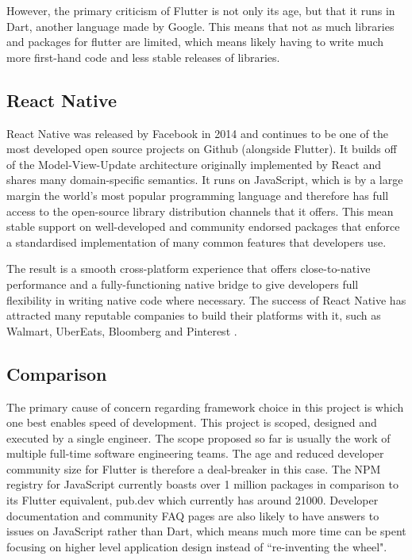 However, the primary criticism of Flutter is not only its age, but that it runs in Dart, another language made by Google. This means that not as much libraries and packages for flutter are limited, which means likely having to write much more first-hand code and less stable releases of libraries.

\subsection{React Native}
React Native was released by Facebook in 2014 and continues to be one of the most developed open source projects on Github (alongside Flutter). It builds off of the Model-View-Update architecture originally implemented by React and shares many domain-specific semantics. It runs on JavaScript, which is by a large margin the world's most popular programming language \cite{sfdevsurvey} and therefore has full access to the open-source library distribution channels that it offers. This mean stable support on well-developed and community endorsed packages that enforce a standardised implementation of many common features that developers use.

The result is a smooth cross-platform experience that offers close-to-native performance and a fully-functioning native bridge to give developers full flexibility in writing native code where necessary. The success of React Native has attracted many reputable companies to build their platforms with it, such as Walmart, UberEats, Bloomberg and Pinterest \cite{rnplatforms}.

\subsection{Comparison}
The primary cause of concern regarding framework choice in this project is which one best enables speed of development. This project is scoped, designed and executed by a single engineer. The scope proposed so far is usually the work of multiple full-time software engineering teams. The age and reduced developer community size for Flutter is therefore a deal-breaker in this case. The NPM registry for JavaScript currently boasts over 1 million packages in comparison to its Flutter equivalent, pub.dev which currently has around 21000. Developer documentation and community FAQ pages are also likely to have answers to issues on JavaScript rather than Dart, which means much more time can be spent focusing on higher level application design instead of ``re-inventing the wheel".

